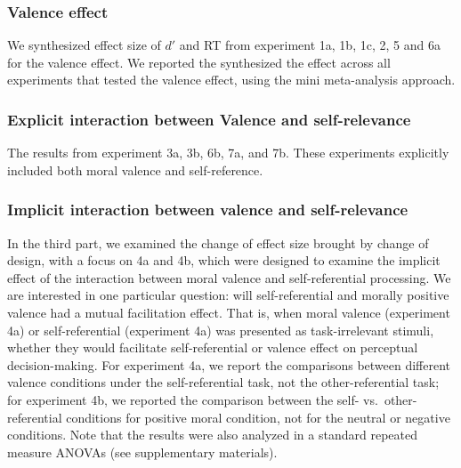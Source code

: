 \documentclass[
  english,
  man]{apa6}
\begin{document}
\hypertarget{valence-effect}{%
\subsubsection{Valence effect}\label{valence-effect}}

We synthesized effect size of \(d'\) and RT from experiment 1a, 1b, 1c, 2, 5 and 6a for the valence effect. We reported the synthesized the effect across all experiments that tested the valence effect, using the mini meta-analysis approach.

\hypertarget{explicit-interaction-between-valence-and-self-relevance}{%
\subsubsection{Explicit interaction between Valence and self-relevance}\label{explicit-interaction-between-valence-and-self-relevance}}

The results from experiment 3a, 3b, 6b, 7a, and 7b. These experiments explicitly included both moral valence and self-reference.

\hypertarget{implicit-interaction-between-valence-and-self-relevance}{%
\subsubsection{Implicit interaction between valence and self-relevance}\label{implicit-interaction-between-valence-and-self-relevance}}

In the third part, we examined the change of effect size brought by change of design, with a focus on 4a and 4b, which were designed to examine the implicit effect of the interaction between moral valence and self-referential processing. We are interested in one particular question: will self-referential and morally positive valence had a mutual facilitation effect. That is, when moral valence (experiment 4a) or self-referential (experiment 4a) was presented as task-irrelevant stimuli, whether they would facilitate self-referential or valence effect on perceptual decision-making. For experiment 4a, we report the comparisons between different valence conditions under the self-referential task, not the other-referential task; for experiment 4b, we reported the comparison between the self- vs.~other-referential conditions for positive moral condition, not for the neutral or negative conditions. Note that the results were also analyzed in a standard repeated measure ANOVAs (see supplementary materials).
\end{document}
